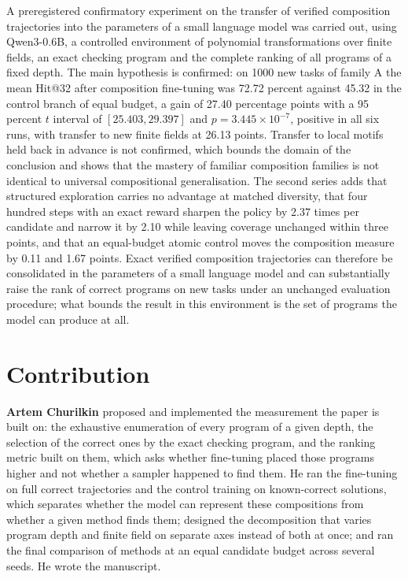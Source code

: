 \documentclass{zapiski}
\begin{document}
A preregistered confirmatory experiment on the transfer of verified composition
trajectories into the parameters of a small language model was carried out, using
Qwen3-0.6B, a controlled environment of polynomial transformations over finite fields,
an exact checking program and the complete ranking of all programs of a fixed depth.
The main hypothesis is confirmed: on 1000 new tasks of family A the mean Hit@32 after
composition fine-tuning was 72.72 percent against 45.32 in the control branch of equal
budget, a gain of 27.40 percentage points with a 95 percent $t$ interval of
$[25.403, 29.397]$ and $p = 3.445 \times 10^{-7}$, positive in all six runs, with
transfer to new finite fields at 26.13 points. Transfer to local motifs held back in
advance is not confirmed, which bounds the domain of the conclusion and shows that the
mastery of familiar composition families is not identical to universal compositional
generalisation. The second series adds that structured exploration carries no advantage
at matched diversity, that four hundred steps with an exact reward sharpen the policy
by 2.37 times per candidate and narrow it by 2.10 while leaving coverage unchanged
within three points, and that an equal-budget atomic control moves the composition
measure by 0.11 and 1.67 points. Exact verified composition trajectories can therefore
be consolidated in the parameters of a small language model and can substantially raise
the rank of correct programs on new tasks under an unchanged evaluation procedure; what
bounds the result in this environment is the set of programs the model can produce at
all.

\section{Contribution}
\label{sec:contribution}


\textbf{Artem Churilkin} proposed and implemented the measurement the paper is built
on: the exhaustive enumeration of every program of a given depth, the selection of the
correct ones by the exact checking program, and the ranking metric built on them, which
asks whether fine-tuning placed those programs higher and not whether a sampler
happened to find them. He ran the fine-tuning on full correct trajectories and the
control training on known-correct solutions, which separates whether the model can
represent these compositions from whether a given method finds them; designed the
decomposition that varies program depth and finite field on separate axes instead of
both at once; and ran the final comparison of methods at an equal candidate budget
across several seeds. He wrote the manuscript.
\end{document}
